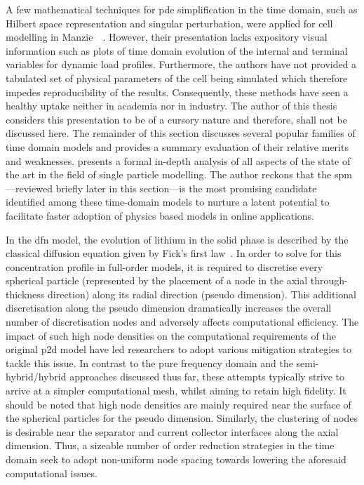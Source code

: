 A few mathematical  techniques for \gls{pde} simplification in  the time domain,
such as Hilbert space representation and singular perturbation, were applied for
cell  modelling in  Manzie~\etal~\cite{Manzie2015}. However,  their presentation
lacks expository  visual information such as  plots of time domain  evolution of
the internal and terminal variables  for dynamic load profiles. Furthermore, the
authors  have  not provided  a  tabulated  set  of  physical parameters  of  the
cell being  simulated which  therefore impedes  reproducibility of  the results.
Consequently, these methods  have seen a healthy uptake neither  in academia nor
in industry. The  author of this thesis  considers this presentation to  be of a
cursory  nature  and therefore,  shall  not  be  discussed here.  The  remainder
of  this  section discusses  several  popular  families  of time  domain  models
and  provides a  summary evaluation  of  their relative  merits and  weaknesses.
 presents a formal in-depth  analysis of all aspects of the
state of the art  in the field of single particle  modelling. The author reckons
that  the  \gls{spm}---reviewed briefly  later  in  this section---is  the  most
promising  candidate identified  among  these time-domain  models  to nurture  a
latent potential to facilitate faster adoption of physics based models in online
applications.



In the \gls{dfn} model, the evolution of lithium in the solid phase is described
by the classical  diffusion equation given by  Fick's first law~\cite{Fick1995}.
In order  to solve for  this concentration profile  in full-order models,  it is
required to discretise every spherical particle (represented by the placement of
a  node  in  the  axial  \ie{} through-thickness  direction)  along  its  radial
direction (pseudo  dimension). This  additional discretisation along  the pseudo
dimension dramatically increases the overall  number of discretisation nodes and
adversely  affects  computational  efficiency.  The impact  of  such  high  node
densities on the computational requirements of the original \gls{p2d} model have
led researchers to adopt various mitigation  strategies to tackle this issue. In
contrast  to the  pure frequency  domain and  the semi-hybrid/hybrid  approaches
discussed  thus far,  these attempts  typically strive  to arrive  at a  simpler
computational mesh,  whilst aiming to retain  high fidelity. It should  be noted
that high node  densities are mainly required near the  surface of the spherical
particles  for the  pseudo  dimension.  Similarly, the  clustering  of nodes  is
desirable near  the separator and  current collector interfaces along  the axial
dimension.  Thus, a
sizeable  number of  order  reduction  strategies in  the  time  domain seek  to
adopt  non-uniform node  spacing  towards lowering  the aforesaid  computational
issues.



